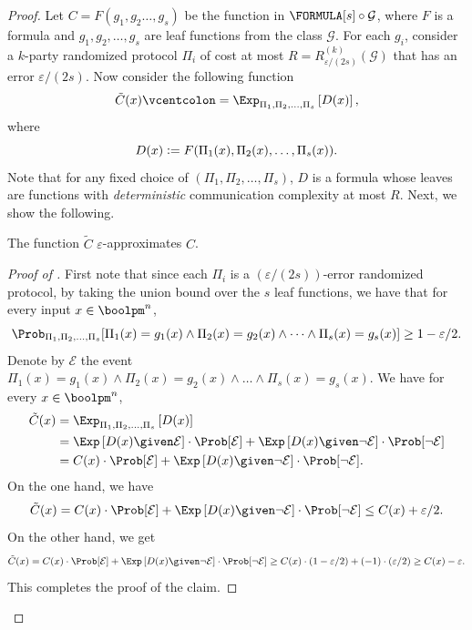     \begin{proof}
        Let $C=F(g_1,g_2\dots,g_s)$ be the function in $\FORMULA[s]\circ\mathcal{G}$, where $F$ is a formula and $g_1,g_2,\dots,g_s$ are leaf functions from the class $\mathcal{G}$. For each  $g_i$, consider a $k$-party randomized protocol $ \Pi_i$ of cost at most $R=R^{(k)}_{\varepsilon/(2s)}(\mathcal{G})$ that has an error $\varepsilon/(2s)$.
        Now consider the following function
        \[
            \tilde{C}(x) \vcentcolon=\Exp_{\Pi_1,\Pi_2,\dots,\Pi_s}\left[D(x)\right],
        \]
        where
        \[
            D(x) \vcentcolon= F(\Pi_1(x),\Pi_2(x),\dots,\Pi_s(x)).
        \]
        Note that for any fixed choice of $(\Pi_1,\Pi_2,\dots,\Pi_s)$, $D$ is a formula whose leaves are functions with \emph{deterministic} communication complexity at most $R$. Next, we show the following.
        
        \begin{claim}\label{claim:lb-approximating}
            The function $\tilde{C}$ $\varepsilon$-approximates $C$.
        \end{claim}
        
        \begin{proof}[Proof of ]
            First note that since each $\Pi_i$ is a $(\varepsilon/(2s))$-error randomized protocol, by taking the union bound over the $s$ leaf functions, we have that for every input $x\in\boolpm^n$,
            \[
                \Prob_{\Pi_1,\Pi_2,\dots,\Pi_s}[\Pi_1(x)=g_1(x) \land \Pi_2(x)=g_2(x) \land\dots\land\Pi_s(x)=g_s(x)]\geq 1-\varepsilon/2.
            \]
            Denote by $\mathcal{E}$ the event $\Pi_1(x)=g_1(x) \land \Pi_2(x)=g_2(x)\land\dots\land\Pi_s(x)=g_s(x)$. We have for every $x\in\boolpm^n$,
            \begin{align*}
                \tilde{C}(x) &= \Exp_{\Pi_1,\Pi_2,\dots,\Pi_s}\left[D(x)\right]\\
                &=\Exp\left[D(x)\given \mathcal{E}\right]\cdot\Prob[\mathcal{E}]+\Exp\left[D(x)\given \neg\mathcal{E}\right]\cdot\Prob[\neg\mathcal{E}]\\
                &=C(x)\cdot\Prob[\mathcal{E}]+\Exp\left[D(x)\given \neg\mathcal{E}\right]\cdot\Prob[\neg\mathcal{E}].
            \end{align*}
            On the one hand, we have
            \[
                \tilde{C}(x)=C(x)\cdot\Prob[\mathcal{E}]+\Exp\left[D(x)\given \neg\mathcal{E}\right]\cdot\Prob[\neg\mathcal{E}]\leq  C(x) + \varepsilon/2.
            \]
            On the other hand, we get
            \[
                \tilde{C}(x)=C(x)\cdot\Prob[\mathcal{E}]+\Exp\left[D(x)\given \neg\mathcal{E}\right]\cdot\Prob[\neg\mathcal{E}]\geq C(x)\cdot(1-\varepsilon/2)+(-1)\cdot(\varepsilon/2)\geq C(x)-\varepsilon.
            \]
            This completes the proof of the claim.
        \end{proof}
        

\end{proof}
